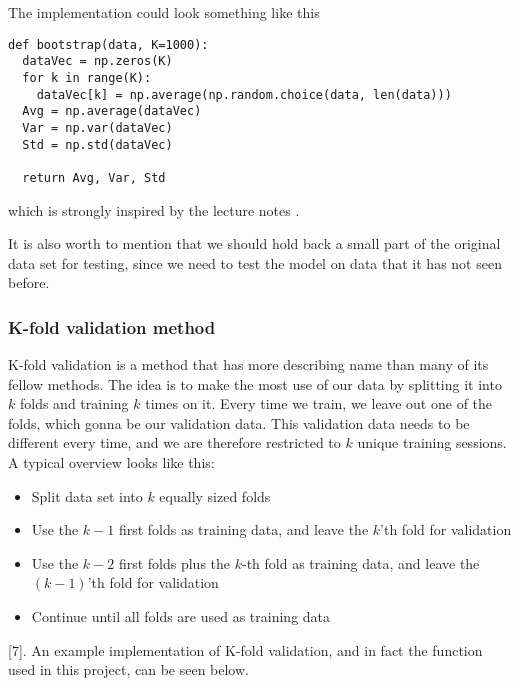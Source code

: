 The implementation could look something like this
\lstset{basicstyle=\scriptsize}
\begin{lstlisting}
def bootstrap(data, K=1000):
  dataVec = np.zeros(K)
  for k in range(K):
    dataVec[k] = np.average(np.random.choice(data, len(data)))
  Avg = np.average(dataVec)
  Var = np.var(dataVec)
  Std = np.std(dataVec)
    
  return Avg, Var, Std
\end{lstlisting}
which is strongly inspired by the lecture notes \cite{Lecture}.

It is also worth to mention that we should hold back a small part of the original data set for testing, since we need to test the model on data that it has not seen before.

\subsubsection{K-fold validation method} \label{sec:kfold}
K-fold validation is a method that has more describing name than many of its fellow methods. The idea is to make the most use of our data by splitting it into $k$ folds and training $k$ times on it. Every time we train, we leave out one of the folds, which gonna be our validation data. This validation data needs to be different every time, and we are therefore restricted to $k$ unique training sessions. A typical overview looks like this:
\begin{itemize}
	\item Split data set into $k$ equally sized folds
	\item Use the $k-1$ first folds as training data, and leave the $k$'th fold for validation
	\item Use the $k-2$ first folds plus the $k$-th fold as training data, and leave the $(k-1)$'th fold for validation
	\item Continue until all folds are used as training data
\end{itemize}
[7]. An example implementation of K-fold validation, and in fact the function used in this project, can be seen below.

